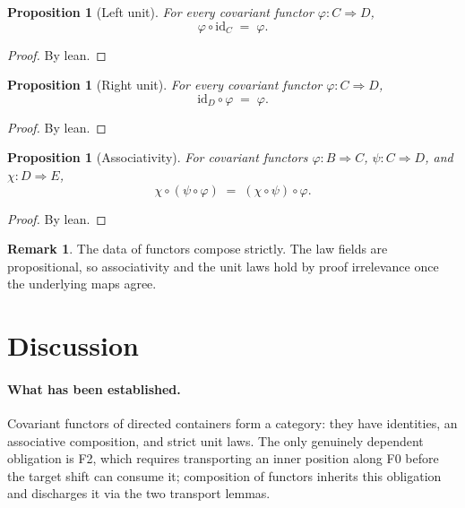 \documentclass[11pt,a4paper]{article}
\theoremstyle{plain}
\newtheorem{proposition}[theorem]{Proposition}
\theoremstyle{definition}
\newtheorem{remark}[theorem]{Remark}
\newcommand{\id}{\mathrm{id}}
\begin{document}
\begin{proposition}[Left unit]\label{prop:id-comp}
For every covariant functor $\varphi : C \Rightarrow D$,
\begin{equation}
  \varphi \circ \id_C \;=\; \varphi.
\end{equation}
\end{proposition}

\begin{proof}
By lean.
\end{proof}

\begin{proposition}[Right unit]\label{prop:comp-id}
For every covariant functor $\varphi : C \Rightarrow D$,
\begin{equation}
  \id_D \circ \varphi \;=\; \varphi.
\end{equation}
\end{proposition}

\begin{proof}
By lean.
\end{proof}

\begin{proposition}[Associativity]\label{prop:comp-assoc}
For covariant functors
$\varphi : B \Rightarrow C$,
$\psi : C \Rightarrow D$, and
$\chi : D \Rightarrow E$,
\begin{equation}
  \chi \circ (\psi \circ \varphi)
  \;=\;
  (\chi \circ \psi) \circ \varphi.
\end{equation}
\end{proposition}

\begin{proof}
By lean.
\end{proof}

\begin{remark}
The data of functors compose strictly. The law fields are propositional, so
associativity and the unit laws hold by proof irrelevance once the underlying
maps agree.
\end{remark}

\section{Discussion}

\paragraph{What has been established.}
Covariant functors of directed containers form a category: they have
identities, an associative composition, and strict unit laws. The only
genuinely dependent obligation is F2, which requires transporting an inner
position along F0 before the target shift can consume it; composition of
functors inherits this obligation and discharges it via the two transport
lemmas.
\end{document}
